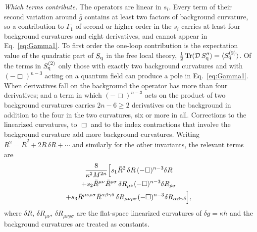 \documentclass[aps,prd,10pt,twocolumn,superscriptaddress,nofootinbib,floatfix,longbibliography]{revtex4-2}
\newcommand{\Tr}{\operatorname{Tr}}
\begin{document}
\textit{Which terms contribute.} The operators are linear in $s_i$. Every term of their second variation around $\bar g$ contains at least two factors of background curvature, so a contribution to $\Gamma_1$ of second or higher order in the $s_i$ carries at least four background curvatures and eight derivatives, and cannot appear in Eq.~\eqref{eq:Gamma1}. To first order the one-loop contribution is the expectation value of the quadratic part of $S_{\rm q}$ in the free local theory, $\frac12\Tr(\mathcal D\,S''_{\rm q})=\langle S^{(2)}_{\rm q}\rangle$. Of the terms in $S^{(2)}_{\rm q}$ only those with exactly two background curvatures and with $(-\Box)^{n-3}$ acting on a quantum field can produce a pole in Eq.~\eqref{eq:Gamma1}. When derivatives fall on the background the operator has more than four derivatives; and a term in which $(-\Box)^{n-3}$ acts on the product of two background curvatures carries $2n-6\ge2$ derivatives on the background in addition to the four in the two curvatures, six or more in all. Corrections to the linearized curvatures, to $\Box$ and to the index contractions that involve the background curvature add more background curvatures. Writing $R^2=\bar R^2+2\bar R\,\delta R+\cdots$ and similarly for the other invariants, the relevant terms are
\begin{multline}
\label{eq:Sq2}
\frac{8}{\kappa^2M^{2n}}\Bigl[s_1\bar R^2\,\delta R\,(-\Box)^{n-3}\delta R\\
+s_2\bar R^{\mu\nu}\bar R^{\rho\sigma}\,\delta R_{\mu\nu}(-\Box)^{n-3}\delta R_{\rho\sigma}\\
+s_3\bar R^{\mu\nu\rho\sigma}\bar R^{\alpha\beta\gamma\delta}\,\delta R_{\mu\nu\rho\sigma}(-\Box)^{n-3}\delta R_{\alpha\beta\gamma\delta}\Bigr],
\end{multline}
where $\delta R$, $\delta R_{\mu\nu}$, $\delta R_{\mu\nu\rho\sigma}$ are the flat-space linearized curvatures of $\delta g=\kappa h$ and the background curvatures are treated as constants.
\end{document}
